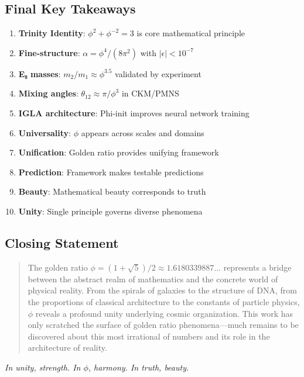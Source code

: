 \subsection*{Final Key Takeaways}

\begin{enumerate}
    \item \textbf{Trinity Identity}: $\phi^2 + \phi^{-2} = 3$ is core mathematical principle
    \item \textbf{Fine-structure}: $\alpha = \phi^4/(8\pi^2)$ with $|\epsilon| < 10^{-7}$
    \item \textbf{E₈ masses}: $m_2/m_1 \approx \phi^{3.5}$ validated by experiment
    \item \textbf{Mixing angles}: $\theta_{12} \approx \pi/\phi^3$ in CKM/PMNS
    \item \textbf{IGLA architecture}: Phi-init improves neural network training
    \item \textbf{Universality}: $\phi$ appears across scales and domains
    \item \textbf{Unification}: Golden ratio provides unifying framework
    \item \textbf{Prediction}: Framework makes testable predictions
    \item \textbf{Beauty}: Mathematical beauty corresponds to truth
    \item \textbf{Unity}: Single principle governs diverse phenomena
\end{enumerate}

\subsection*{Closing Statement}

\begin{quote}
The golden ratio $\phi = (1+\sqrt{5})/2 \approx 1.6180339887...$ represents a bridge between the abstract realm of mathematics and the concrete world of physical reality. From the spirals of galaxies to the structure of DNA, from the proportions of classical architecture to the constants of particle physics, $\phi$ reveals a profound unity underlying cosmic organization. This work has only scratched the surface of golden ratio phenomena—much remains to be discovered about this most irrational of numbers and its role in the architecture of reality.
\end{quote}

\begin{center}
\textit{In unity, strength. In $\phi$, harmony. In truth, beauty.}
\end{center}

